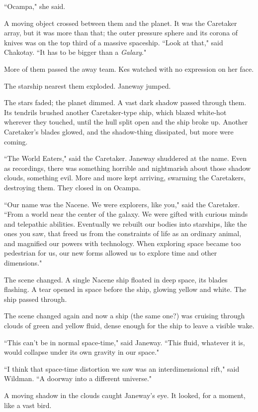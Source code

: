 \documentclass[twoside,letterpaper,12pt]{memoir}
\begin{document}
``Ocampa," she said. 

A moving object crossed between them and the planet. It was the Caretaker array, but it was more than that; the outer pressure sphere and its corona of knives was on the top third of a massive spaceship. ``Look at that," said Chakotay. ``It has to be bigger than a \textit{Galaxy}." 

More of them passed the away team. Kes watched with no expression on her face. 

The starship nearest them exploded. Janeway jumped. 

The stars faded; the planet dimmed. A vast dark shadow passed through them. Its tendrils brushed another Caretaker-type ship, which blazed white-hot wherever they touched, until the hull split open and the ship broke up. Another Caretaker's blades glowed, and the shadow-thing dissipated, but more were coming. 

``The World Eaters," said the Caretaker. Janeway shuddered at the name. Even as recordings, there was something horrible and nightmarish about those shadow clouds, something evil. More and more kept arriving, swarming the Caretakers, destroying them. They closed in on Ocampa. 

``Our name was the Nacene. We were explorers, like you," said the Caretaker. ``From a world near the center of the galaxy. We were gifted with curious minds and telepathic abilities. Eventually we rebuilt our bodies into starships, like the ones you saw, that freed us from the constraints of life as an ordinary animal, and magnified our powers with technology. When exploring space became too pedestrian for us, our new forms allowed us to explore time and other dimensions." 

The scene changed. A single Nacene ship floated in deep space, its blades flashing. A tear opened in space before the ship, glowing yellow and white. The ship passed through. 

The scene changed again and now a ship (the same one?) was cruising through clouds of green and yellow fluid, dense enough for the ship to leave a visible wake. 

``This can't be in normal space-time," said Janeway. ``This fluid, whatever it is, would collapse under its own gravity in our space." 

``I think that space-time distortion we saw was an interdimensional rift," said Wildman. ``A doorway into a different universe." 

A moving shadow in the clouds caught Janeway's eye. It looked, for a moment, like a vast bird. 
\end{document}
